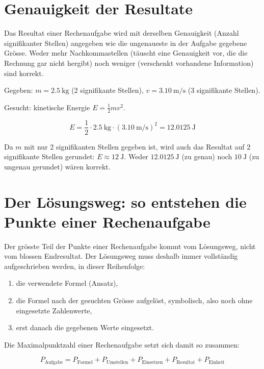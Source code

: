\documentclass[11pt,a4paper]{article}
\begin{document}
\section*{Genauigkeit der Resultate}

Das Resultat einer Rechenaufgabe wird mit derselben Genauigkeit
(Anzahl signifikanter Stellen) angegeben wie die ungenaueste in der
Aufgabe gegebene Grösse. Weder mehr Nachkommastellen (täuscht eine
Genauigkeit vor, die die Rechnung gar nicht hergibt) noch weniger
(verschenkt vorhandene Information) sind korrekt.

\begin{beispielbox}
Gegeben: $m = \SI{2.5}{\kilo\gram}$ (2 signifikante Stellen),
$v = \SI{3.10}{\meter\per\second}$ (3 signifikante Stellen).

Gesucht: kinetische Energie $E = \frac{1}{2} m v^2$.

\[
E = \frac{1}{2} \cdot \SI{2.5}{\kilo\gram} \cdot (\SI{3.10}{\meter\per\second})^2
  = \SI{12.0125}{\joule}
\]

Da $m$ mit nur 2 signifikanten Stellen gegeben ist, wird auch das
Resultat auf 2 signifikante Stellen gerundet: $E \approx \SI{12}{\joule}$.
Weder $\SI{12.0125}{\joule}$ (zu genau) noch $\SI{10}{\joule}$ (zu
ungenau gerundet) wären korrekt.
\end{beispielbox}

\section*{Der Lösungsweg: so entstehen die Punkte einer Rechenaufgabe}

Der grösste Teil der Punkte einer Rechenaufgabe kommt vom Lösungsweg,
nicht vom blossen Endresultat. Der Lösungsweg muss deshalb immer
vollständig aufgeschrieben werden, in dieser Reihenfolge:

\begin{enumerate}
  \item die verwendete Formel (Ansatz),
  \item die Formel nach der gesuchten Grösse aufgelöst, symbolisch, also
    noch ohne eingesetzte Zahlenwerte,
  \item erst danach die gegebenen Werte eingesetzt.
\end{enumerate}

Die Maximalpunktzahl einer Rechenaufgabe setzt sich damit so zusammen:

\[
P_{\text{Aufgabe}} = P_{\text{Formel}} + P_{\text{Umstellen}}
  + P_{\text{Einsetzen}} + P_{\text{Resultat}} + P_{\text{Einheit}}
\]
\end{document}
